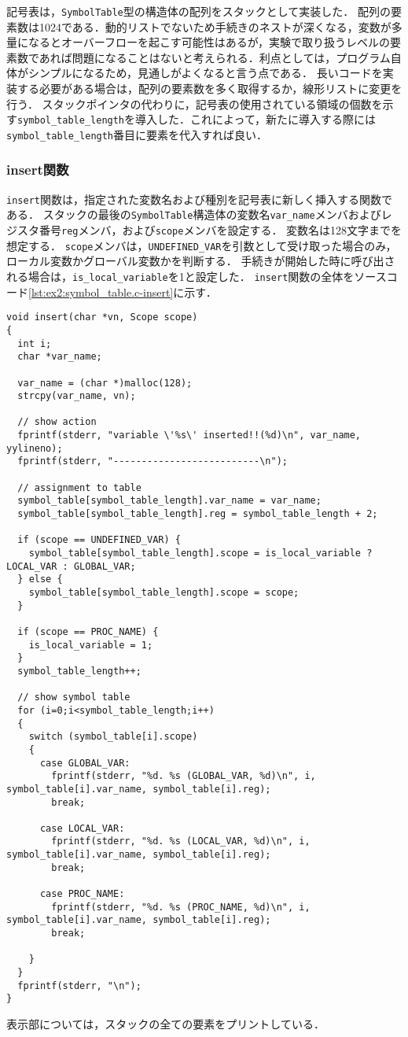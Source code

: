 \documentclass[uplatex]{jsarticle}
\begin{document}
記号表は，\verb#SymbolTable#型の構造体の配列をスタックとして実装した．
配列の要素数は1024である．動的リストでないため手続きのネストが深くなる，変数が多量になるとオーバーフローを起こす可能性はあるが，実験で取り扱うレベルの要素数であれば問題になることはないと考えられる．利点としては，プログラム自体がシンプルになるため，見通しがよくなると言う点である．
長いコードを実装する必要がある場合は，配列の要素数を多く取得するか，線形リストに変更を行う．
スタックポインタの代わりに，記号表の使用されている領域の個数を示す\verb#symbol_table_length#を導入した．これによって，新たに導入する際には\verb#symbol_table_length#番目に要素を代入すれば良い．

\subsubsection{insert関数}
\verb#insert#関数は，指定された変数名および種別を記号表に新しく挿入する関数である．
スタックの最後の\verb#SymbolTable#構造体の変数名\verb#var_name#メンバおよびレジスタ番号\verb#reg#メンバ，および\verb#scope#メンバを設定する．
変数名は128文字までを想定する．
\verb#scope#メンバは，\verb#UNDEFINED_VAR#を引数として受け取った場合のみ，ローカル変数かグローバル変数かを判断する．
手続きが開始した時に呼び出される場合は，\verb#is_local_variable#を1と設定した．
\verb#insert#関数の全体をソースコード\ref{lst:ex2:symbol_table.c-insert}に示す．

\begin{lstlisting}[caption=insert関数,label=lst:ex2:symbol_table.c-insert]
void insert(char *vn, Scope scope)
{
  int i;
  char *var_name;

  var_name = (char *)malloc(128);
  strcpy(var_name, vn);

  // show action
  fprintf(stderr, "variable \'%s\' inserted!!(%d)\n", var_name, yylineno);
  fprintf(stderr, "--------------------------\n");

  // assignment to table
  symbol_table[symbol_table_length].var_name = var_name;
  symbol_table[symbol_table_length].reg = symbol_table_length + 2;

  if (scope == UNDEFINED_VAR) {
    symbol_table[symbol_table_length].scope = is_local_variable ? LOCAL_VAR : GLOBAL_VAR;
  } else {
    symbol_table[symbol_table_length].scope = scope;
  }

  if (scope == PROC_NAME) {
    is_local_variable = 1;
  }
  symbol_table_length++;

  // show symbol table
  for (i=0;i<symbol_table_length;i++)
  {
    switch (symbol_table[i].scope)
    {
      case GLOBAL_VAR:
        fprintf(stderr, "%d. %s (GLOBAL_VAR, %d)\n", i, symbol_table[i].var_name, symbol_table[i].reg);
        break;

      case LOCAL_VAR:
        fprintf(stderr, "%d. %s (LOCAL_VAR, %d)\n", i, symbol_table[i].var_name, symbol_table[i].reg);
        break;

      case PROC_NAME:
        fprintf(stderr, "%d. %s (PROC_NAME, %d)\n", i, symbol_table[i].var_name, symbol_table[i].reg);
        break;

    }
  }
  fprintf(stderr, "\n");
}
\end{lstlisting}
表示部については，スタックの全ての要素をプリントしている．
\end{document}
